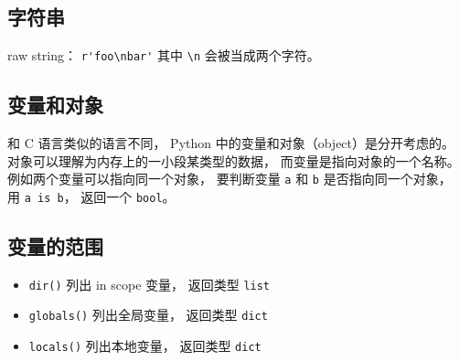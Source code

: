 \subsection{字符串}
raw string： \verb`r'foo\nbar'` 其中 \verb`\n` 会被当成两个字符。

\subsection{变量和对象}
和 C 语言类似的语言不同， Python 中的变量和对象（object）是分开考虑的。 对象可以理解为内存上的一小段某类型的数据， 而变量是指向对象的一个名称。 例如两个变量可以指向同一个对象， 要判断变量 \verb`a` 和 \verb`b` 是否指向同一个对象， 用 \verb`a is b`， 返回一个 \verb`bool`。

\subsection{变量的范围}
\begin{itemize}
\item \verb`dir()` 列出 in scope 变量， 返回类型 \verb`list`
\item \verb`globals()` 列出全局变量， 返回类型 \verb`dict`
\item \verb`locals()` 列出本地变量， 返回类型 \verb`dict`
\end{itemize}
